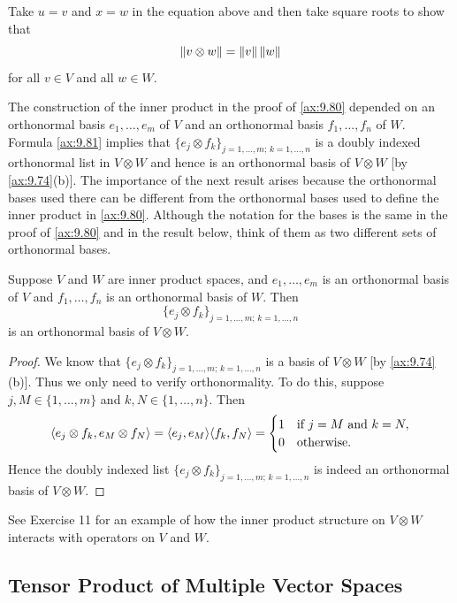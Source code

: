 Take $u=v$ and $x=w$ in the equation above and then take square roots to show
that
\[ \lVert v\otimes w \rVert = \lVert v \rVert\,\lVert w \rVert \]
for all $v\in V$ and all $w\in W$.

The construction of the inner product in the proof of \ref{ax:9.80} depended
on an orthonormal basis $e_1,\dots,e_m$ of $V$ and an orthonormal basis
$f_1,\dots,f_n$ of $W$. Formula \ref{ax:9.81} implies that
$\{e_j\otimes f_k\}_{j=1,\dots,m;\,k=1,\dots,n}$ is a doubly indexed
orthonormal list in $V\otimes W$ and hence is an orthonormal basis of
$V\otimes W$ [by \ref{ax:9.74}(b)]. The importance of the next result arises
because the orthonormal bases used there can be different from the orthonormal
bases used to define the inner product in \ref{ax:9.80}. Although the notation
for the bases is the same in the proof of \ref{ax:9.80} and in the result
below, think of them as two different sets of orthonormal bases.

\begin{result}\label{ax:9.83}
Suppose $V$ and $W$ are inner product spaces, and $e_1,\dots,e_m$ is an
orthonormal basis of $V$ and $f_1,\dots,f_n$ is an orthonormal basis of $W$.
Then
\[ \{e_j\otimes f_k\}_{j=1,\dots,m;\,k=1,\dots,n} \]
is an orthonormal basis of $V\otimes W$.
\end{result}

\begin{proof}
We know that $\{e_j\otimes f_k\}_{j=1,\dots,m;\,k=1,\dots,n}$ is a basis of
$V\otimes W$ [by \ref{ax:9.74}(b)]. Thus we only need to verify
orthonormality. To do this, suppose $j,M\in\{1,\dots,m\}$ and
$k,N\in\{1,\dots,n\}$. Then
\[ \langle e_j\otimes f_k, e_M\otimes f_N \rangle = \langle e_j, e_M \rangle\langle f_k, f_N \rangle
   = \begin{cases} 1 & \text{if } j=M \text{ and } k=N,\\
                   0 & \text{otherwise.} \end{cases} \]
Hence the doubly indexed list $\{e_j\otimes f_k\}_{j=1,\dots,m;\,k=1,\dots,n}$
is indeed an orthonormal basis of $V\otimes W$.
\end{proof}

See Exercise 11 for an example of how the inner product structure on
$V\otimes W$ interacts with operators on $V$ and $W$.

\subsection{Tensor Product of Multiple Vector Spaces}

